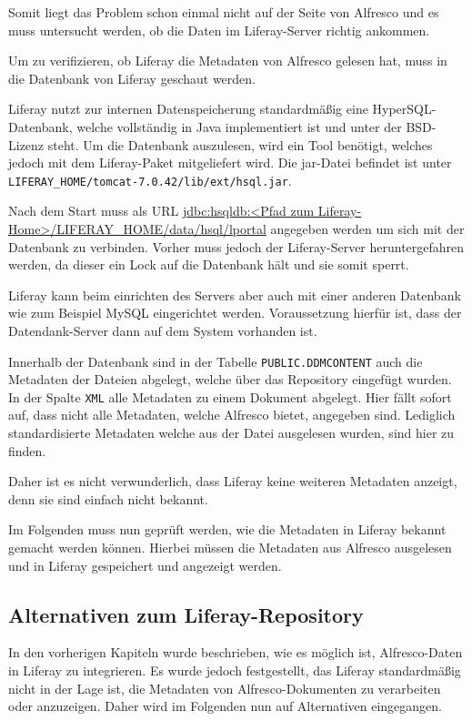 Somit liegt das Problem schon einmal nicht auf der Seite von Alfresco und es muss untersucht werden, ob die Daten im Liferay-Server richtig ankommen.

Um zu verifizieren, ob Liferay die Metadaten von Alfresco gelesen hat, muss in die Datenbank von Liferay geschaut werden.

Liferay nutzt zur internen Datenspeicherung standardm\"a\ss{}ig eine HyperSQL-Datenbank, welche vollst\"andig in Java implementiert ist und unter der BSD-Lizenz steht. Um die Datenbank auszulesen, wird ein Tool ben\"otigt, welches jedoch mit dem Liferay-Paket mitgeliefert wird. Die jar-Datei befindet ist unter \texttt{LIFERAY\_HOME/tomcat-7.0.42/lib/ext/hsql.jar}.

Nach dem Start muss als URL \url{jdbc:hsqldb:<Pfad zum Liferay-Home>/LIFERAY\_HOME/data/hsql/lportal} angegeben werden um sich mit der Datenbank zu verbinden. Vorher muss jedoch der Liferay-Server heruntergefahren werden, da dieser ein Lock auf die Datenbank h\"alt und sie somit sperrt.

Liferay kann beim einrichten des Servers aber auch mit einer anderen Datenbank wie zum Beispiel MySQL eingerichtet werden. Voraussetzung hierf\"ur ist, dass der Datendank-Server dann auf dem System vorhanden ist.

Innerhalb der Datenbank sind in der Tabelle \texttt{PUBLIC.DDMCONTENT} auch die Metadaten der Dateien abgelegt, welche \"uber das Repository eingef\"ugt wurden. In der Spalte \texttt{XML} alle Metadaten zu einem Dokument abgelegt. Hier f\"allt sofort auf, dass nicht alle Metadaten, welche Alfresco bietet, angegeben sind. Lediglich standardisierte Metadaten welche aus der Datei ausgelesen wurden, sind hier zu finden. 

Daher ist es nicht verwunderlich, dass Liferay keine weiteren Metadaten anzeigt, denn sie sind einfach nicht bekannt.

Im Folgenden muss nun gepr\"uft werden, wie die Metadaten in Liferay bekannt gemacht werden k\"onnen. Hierbei m\"ussen die Metadaten aus Alfresco ausgelesen und in Liferay gespeichert und angezeigt werden.

\subsection{Alternativen zum Liferay-Repository}
In den vorherigen Kapiteln wurde beschrieben, wie es m\"oglich ist, Alfresco-Daten in Liferay zu integrieren. Es wurde jedoch festgestellt, das Liferay standardm\"a\ss{}ig nicht in der Lage ist, die Metadaten von Alfresco-Dokumenten zu verarbeiten oder anzuzeigen. Daher wird im Folgenden nun auf Alternativen eingegangen.

